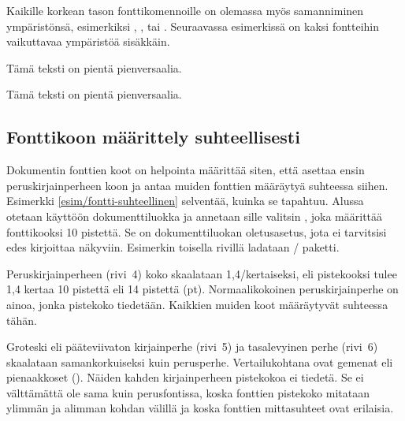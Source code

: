 Kaikille korkean tason fonttikomennoille on olemassa myös samanniminen
ympäristönsä, esimerkiksi , ,
 tai . Seuraavassa esimerkissä on
kaksi fontteihin vaikuttavaa ympäristöä sisäkkäin.

\begin{koodilohkosis}
\begin{footnotesize}
  \begin{scshape}
    Tämä teksti on pientä pienversaalia.
  \end{scshape}
\end{footnotesize}
\end{koodilohkosis}

\begin{tulossis}
  \begin{footnotesize}
    \begin{scshape}
      Tämä teksti on pientä pienversaalia.
    \end{scshape}
  \end{footnotesize}
\end{tulossis}

\subsection{Fonttikoon määrittely suhteellisesti}
\label{luku/fontti-suhteellinen}

Dokumentin fonttien koot on helpointa määrittää siten, että asettaa
ensin peruskirjainperheen koon ja antaa muiden fonttien määräytyä
suhteessa siihen. Esimerkki \ref{esim/fontti-suhteellinen} selventää,
kuinka se tapahtuu. Alussa otetaan käyttöön dokumenttiluokka
 ja annetaan sille valitsin \koodi{10pt}, joka määrittää
fonttikooksi 10 pistettä. Se on dokumenttiluokan oletusasetus, jota ei
tarvitsisi edes kirjoittaa näkyviin. Esimerkin toisella rivillä ladataan
\-/ paketti.

Peruskirjainperheen (rivi~4) koko skaalataan 1,4\-/kertaiseksi, eli
pistekooksi tulee 1,4 kertaa 10 pistettä eli 14 pistettä (pt).
Normaalikokoinen peruskirjainperhe on ainoa, jonka pistekoko tiedetään.
Kaikkien muiden koot määräytyvät suhteessa tähän.

Groteski eli pääteviivaton kirjainperhe (rivi~5) ja tasalevyinen perhe
(rivi~6) skaalataan samankorkuiseksi kuin perusperhe. Vertailukohtana
ovat gemenat eli pienaakkoset (). Näiden kahden
kirjainperheen pistekokoa ei tiedetä. Se ei välttämättä ole sama kuin
perusfontissa, koska fonttien pistekoko mitataan ylimmän ja alimman
kohdan välillä ja koska fonttien mittasuhteet ovat erilaisia.

